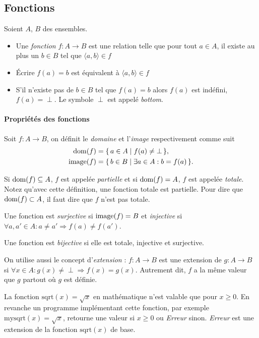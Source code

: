 
\subsection{Fonctions}
\label{subsec:fonctions}
Soient $A$, $B$ des ensembles.
\begin{itemize}
  	\item Une \emph{fonction} $f \colon A \rightarrow B$ est une relation telle que pour tout $a \in
	A$, il existe au plus un $b \in B$ tel que $\langle a,b \rangle \in f$
	\item Écrire $f(a)=b$ est équivalent à $\langle a,b \rangle \in f$
	\item S'il n'existe pas de $b \in B$ tel que $f(a)=b$ alors $f(a)$ est indéfini,
		$f(a) = \perp$.  Le symbole $\perp$ est appelé \emph{bottom}.
\end{itemize}

\paragraph{Propriétés des fonctions}
\label{par:proprietes_des_fonctions}
Soit $f\colon A \to B$, on définit le \emph{domaine} et l'\emph{image} respectivement comme suit
\begin{align*}
  \operatorname{dom}(f)   & = \{\, a \in A \mid f(a) \neq \bot \,\},\\
  \operatorname{image}(f) & = \{\, b \in B \mid \exists a \in A : b = f(a) \,\}.
\end{align*}

Si $\operatorname{dom}(f) \subseteq A$, $f$ est appelée \emph{partielle} et si $\operatorname{dom}(f) = A$, $f$ est appelée \emph{totale}.
Notez qu'avec cette définition, une fonction totale est partielle.
Pour dire que $\operatorname{dom}(f) \subset A$, il faut dire que $f$ n'est pas totale.

Une fonction est \emph{surjective} si $\operatorname{image}(f) = B$ et \emph{injective} si $\forall a,a' \in A : a \neq a' \Rightarrow f(a) \neq f(a')$.

Une fonction est \emph{bijective} si elle est totale, injective et surjective.

On utilise aussi le concept d'\emph{extension} :
$f: A \rightarrow B$ est une extension de $g: A \rightarrow B$ si $\forall x \in A : g(x)\neq \perp \Rightarrow f(x) = g(x)$.
Autrement dit, $f$ a la même valeur que $g$ partout où $g$ est définie.

La fonction $\mathrm{sqrt}(x) = \sqrt{x}$ en mathématique n'est valable que pour $x\geq0$. En revanche un programme implémentant cette fonction, par exemple $\mathrm{mysqrt}(x) = \sqrt{x}$, retourne une valeur si $x\geq0$ ou \textit{Erreur} sinon. \textit{Erreur} est une extension de la fonction $\mathrm{sqrt}(x)$ de base.

